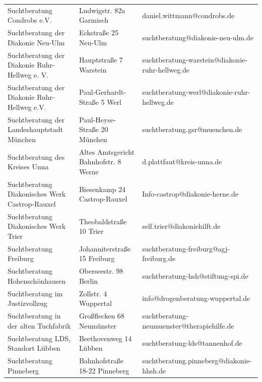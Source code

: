 {\begin{xltabular}{\textwidth} {
 >{\raggedright\arraybackslash}p{5cm}
 >{\raggedright\arraybackslash}X
 >{\raggedright\arraybackslash}p{5cm} }
Suchtberatung Condrobs e.V. & Ludwigstr. 82a Garmisch & daniel.wittmann@condrobs.de \\
Suchtberatung der Diakonie Neu-Ulm & Eckstraße 25 Neu-Ulm & suchtberatung@diakonie-neu-ulm.de \\
Suchtberatung der Diakonie Ruhr-Hellweg e. V. & Hauptstraße 7 Warstein & suchtberatung-warstein@diakonie-ruhr-hellweg.de \\
Suchtberatung der Diakonie Ruhr-Hellweg e.V. & Paul-Gerhardt-Straße 5 Werl & suchtberatung-werl@diakonie-ruhr-hellweg.de \\
Suchtberatung der Landeshauptstadt München & Paul-Heyse-Straße 20 München & suchtberatung.gsr@muenchen.de \\
Suchtberatung des Kreises Unna & Altes Amtsgericht Bahnhofstr. 8 Werne & d.plattfaut@kreis-unna.de \\
Suchtberatung Diakonisches Werk Castrop-Rauxel & Biesenkamp 24 Castrop-Rauxel & Info-castrop@diakonie-herne.de \\
Suchtberatung Diakonisches Werk Trier & Theobaldstraße 10 Trier & self.trier@diakoniehilft.de \\
Suchtberatung Freiburg & Johanniterstraße 15 Freiburg & suchtberatung-freiburg@agj-freiburg.de \\
Suchtberatung Hohenschönhausen & Oberseestr. 98 Berlin & suchtberatung-hsh@stiftung-spi.de \\
Suchtberatung im Justizvollzug & Zollstr. 4 Wuppertal & info@drogenberatung-wuppertal.de \\
Suchtberatung in der alten Tuchfabrik & Großflecken 68 Neumünster & suchtberatung-neumuenster@therapiehilfe.de \\
Suchtberatung LDS, Standort Lübben & Beethovenweg 14 Lübben & suchtberatung-lds@tannenhof.de \\
Suchtberatung Pinneberg & Bahnhofstraße 18-22 Pinneberg & suchtberatung.pinneberg@diakonie-hhsh.de \\

\end{xltabular}}
